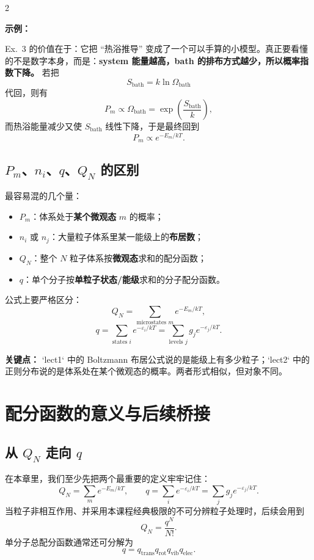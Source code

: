 \documentclass[a4paper,9pt]{article}
\newenvironment{keypoint}
{\par\vspace{0.3em}\noindent\begin{tcolorbox}[
  colback=keybg,
  colframe=keycolor,
  boxrule=0.5pt,
  arc=2pt,
  left=2pt,
  right=2pt,
  top=2pt,
  bottom=2pt,
  boxsep=0pt,
  ]
\noindent\textcolor{keycolor}{\textbf{关键点：}}}
{\end{tcolorbox}\par\vspace{0.3em}}
\newenvironment{examplebox}
{\par\vspace{0.3em}\noindent\begin{tcolorbox}[
  colback=boxbg,
  colframe=derivcolor,
  boxrule=0.5pt,
  arc=2pt,
  left=2pt,
  right=2pt,
  top=2pt,
  bottom=2pt,
  boxsep=0pt,
  ]
\scriptsize\noindent\textcolor{derivcolor}{\textbf{示例：}}\par
\setlength{\parskip}{0.1ex}\setlength{\itemsep}{0pt}\setlength{\parsep}{0pt}}
{\end{tcolorbox}\par\vspace{0.3em}}
\begin{document}
\begin{multicols}{2}
	\begin{examplebox}
		Ex.~3 的价值在于：它把 ``热浴推导'' 变成了一个可以手算的小模型。真正要看懂的不是数字本身，而是：\textbf{system 能量越高，bath 的排布方式越少，所以概率指数下降。}
		若把
		\[
			S_{\mathrm{bath}}=k\ln\Omega_{\mathrm{bath}}
		\]
		代回，则有
		\[
			P_m\propto \Omega_{\mathrm{bath}}=\exp\left(\frac{S_{\mathrm{bath}}}{k}\right),
		\]
		而热浴能量减少又使 $S_{\mathrm{bath}}$ 线性下降，于是最终回到
		\[
			P_m\propto e^{-E_m/kT}.
		\]
	\end{examplebox}

	\subsection{$P_m$、$n_i$、$q$、$Q_N$ 的区别}
	最容易混的几个量：
	\begin{itemize}
		\item $P_m$：体系处于\textbf{某个微观态} $m$ 的概率；
		\item $n_i$ 或 $n_j$：大量粒子体系里某一能级上的\textbf{布居数}；
		\item $Q_N$：整个 $N$ 粒子体系按\textbf{微观态}求和的配分函数；
		\item $q$：单个分子按\textbf{单粒子状态/能级}求和的分子配分函数。
	\end{itemize}

	公式上要严格区分：
	\[
		Q_N=\sum_{\text{microstates }m} e^{-E_m/kT},
	\]
	\[
		q=\sum_{\text{states }i} e^{-\varepsilon_i/kT}
		=\sum_{\text{levels }j} g_j e^{-\varepsilon_j/kT}.
	\]

	\begin{keypoint}
		`lect1` 中的 Boltzmann 布居公式说的是能级上有多少粒子；`lect2` 中的正则分布说的是体系处在某个微观态的概率。两者形式相似，但对象不同。
	\end{keypoint}

	\section{配分函数的意义与后续桥接}

	\subsection{从 $Q_N$ 走向 $q$}
	在本章里，我们至少先把两个最重要的定义牢牢记住：
	\[
		Q_N=\sum_m e^{-E_m/kT},
		\qquad
		q=\sum_i e^{-\varepsilon_i/kT}=
		\sum_j g_j e^{-\varepsilon_j/kT}.
	\]
	当粒子非相互作用、并采用本课程经典极限的不可分辨粒子处理时，后续会用到
	\[
		Q_N=\frac{q^N}{N!}.
	\]
	单分子总配分函数通常还可分解为
	\[
		q=q_{\mathrm{trans}}q_{\mathrm{rot}}q_{\mathrm{vib}}q_{\mathrm{elec}}.
	\]


\end{multicols}
\end{document}
